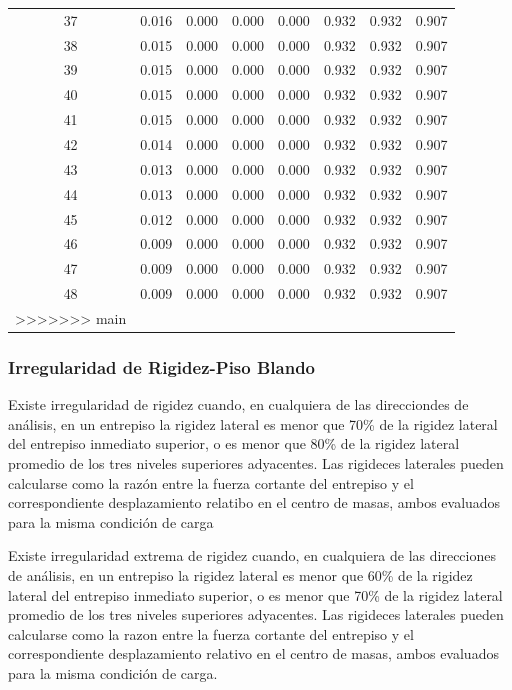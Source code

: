 \documentclass{article}%
\begin{document}
\begin{table}[h!]
\begin{tabular}{cccccccc}
37 & 0.016 & 0.000 & 0.000 & 0.000 & 0.932 & 0.932 & 0.907 \\
38 & 0.015 & 0.000 & 0.000 & 0.000 & 0.932 & 0.932 & 0.907 \\
39 & 0.015 & 0.000 & 0.000 & 0.000 & 0.932 & 0.932 & 0.907 \\
40 & 0.015 & 0.000 & 0.000 & 0.000 & 0.932 & 0.932 & 0.907 \\
41 & 0.015 & 0.000 & 0.000 & 0.000 & 0.932 & 0.932 & 0.907 \\
42 & 0.014 & 0.000 & 0.000 & 0.000 & 0.932 & 0.932 & 0.907 \\
43 & 0.013 & 0.000 & 0.000 & 0.000 & 0.932 & 0.932 & 0.907 \\
44 & 0.013 & 0.000 & 0.000 & 0.000 & 0.932 & 0.932 & 0.907 \\
45 & 0.012 & 0.000 & 0.000 & 0.000 & 0.932 & 0.932 & 0.907 \\
46 & 0.009 & 0.000 & 0.000 & 0.000 & 0.932 & 0.932 & 0.907 \\
47 & 0.009 & 0.000 & 0.000 & 0.000 & 0.932 & 0.932 & 0.907 \\
48 & 0.009 & 0.000 & 0.000 & 0.000 & 0.932 & 0.932 & 0.907 \\
>>>>>>> main
\bottomrule
\end{tabular}
%
\end{table}

%
\subsubsection{Irregularidad de Rigidez{-}Piso Blando}%
\label{ssubsec:IrregularidaddeRigidez{-}PisoBlando}%
\begin{tcolorbox}[colback=gray!5!white,colframe=cyan!75!black,fonttitle=\bfseries,title=Tabla N°9 E-030]%
Existe irregularidad de rigidez cuando, en cualquiera de las direcciondes de análisis, en un entrepiso la rigidez lateral es menor que 70\% de la rigidez lateral del entrepiso inmediato superior, o es menor que 80\% de la rigidez lateral promedio de los tres niveles superiores adyacentes. 
 Las rigideces laterales pueden calcularse como la razón entre la fuerza cortante del entrepiso y el correspondiente desplazamiento relatibo en el centro de masas, ambos evaluados para la misma condición de carga %
\end{tcolorbox}%
\begin{tcolorbox}[colback=gray!5!white,colframe=cyan!75!black,fonttitle=\bfseries,title=Tabla N°9 E-030]%

Existe irregularidad extrema de rigidez cuando, en cualquiera de las direcciones de análisis, en un entrepiso la rigidez lateral es menor que 60\% de la rigidez lateral del entrepiso inmediato superior, o es menor que 70\% de la rigidez lateral promedio de los tres niveles superiores adyacentes.
Las rigideces laterales pueden calcularse como la razon entre la fuerza cortante del entrepiso y el correspondiente desplazamiento relativo en el centro de masas, ambos evaluados para la misma condición de carga.%
\end{tcolorbox}%
%
\end{document}
